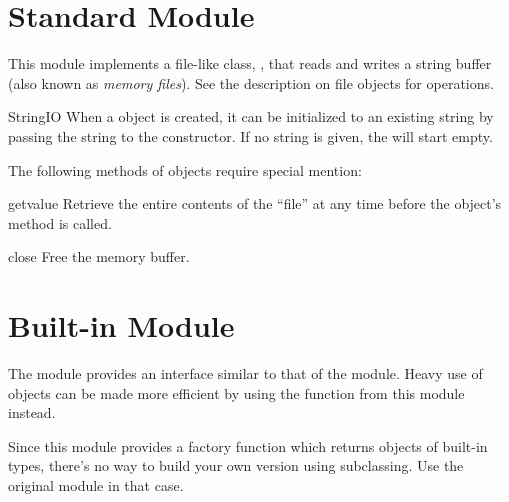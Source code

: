 \section{Standard Module }
\label{module-StringIO}


This module implements a file-like class, ,
that reads and writes a string buffer (also known as \emph{memory
files}). See the description on file objects for operations.

\begin{classdesc}{StringIO}{}
When a  object is created, it can be initialized
to an existing string by passing the string to the constructor.
If no string is given, the  will start empty.
\end{classdesc}

The following methods of  objects require special
mention:

\begin{methoddesc}{getvalue}{}
Retrieve the entire contents of the ``file'' at any time before the
 object's  method is called.
\end{methoddesc}

\begin{methoddesc}{close}{}
Free the memory buffer.
\end{methoddesc}


\section{Built-in Module }
\label{module-cStringIO}


The module  provides an interface similar to that of
the  module.  Heavy use of 
objects can be made more efficient by using the function
 from this module instead.

Since this module provides a factory function which returns objects of
built-in types, there's no way to build your own version using
subclassing.  Use the original  module in that case.
